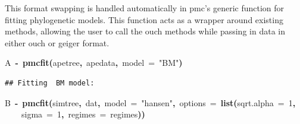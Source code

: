 \documentclass{elsarticle}
\makeatletter
\newcommand{\hlnumber}[1]{\textcolor[rgb]{0,0,0}{#1}}%
\newcommand{\hlfunctioncall}[1]{\textcolor[rgb]{.5,0,.33}{\textbf{#1}}}%
\newcommand{\hlstring}[1]{\textcolor[rgb]{.6,.6,1}{#1}}%
\newcommand{\hlkeyword}[1]{\textbf{#1}}%
\newcommand{\hlargument}[1]{\textcolor[rgb]{.69,.25,.02}{#1}}%
\newcommand{\hlassignement}[1]{\textbf{#1}}%
\newcommand{\hlsymbol}[1]{#1}%
\newcommand{\hlstd}[1]{\textcolor[rgb]{0,0,0}{#1}}%
\newenvironment{kframe}{%
 \def\FrameCommand##1{\hskip\@totalleftmargin \hskip-\fboxsep
 \colorbox{shadecolor}{##1}\hskip-\fboxsep
     \hskip-\linewidth \hskip-\@totalleftmargin \hskip\columnwidth}%
 \MakeFramed {\advance\hsize-\width
   \@totalleftmargin\z@ \linewidth\hsize
   \@setminipage}}%
 {\par\unskip\endMakeFramed}
\newenvironment{knitrout}{}{} %
\makeatother
\begin{document}
This format swapping is handled automatically in pmc's generic function for fitting phylogenetic models.  This function acts as a wrapper around existing methods, allowing the user to call the ouch methods while passing in data in either ouch or geiger format.   
\begin{knitrout}
\color{fgcolor}\begin{kframe}
\begin{flushleft}
\ttfamily\noindent
\hlsymbol{A}{\ }\hlassignement{\usebox{\hlnormalsizeboxlessthan}-}{\ }\hlfunctioncall{pmc\usebox{\hlnormalsizeboxunderscore}fit}\hlkeyword{(}\hlsymbol{ape}\hlkeyword{\usebox{\hlnormalsizeboxdollar}}\hlsymbol{tree}\hlkeyword{,}{\ }\hlsymbol{ape}\hlkeyword{\usebox{\hlnormalsizeboxdollar}}\hlsymbol{data}\hlkeyword{,}{\ }\hlargument{model}{\ }\hlargument{=}{\ }\hlstring{"{}BM"{}}\hlkeyword{)}\mbox{}
\normalfont
\end{flushleft}
\begin{verbatim}
## Fitting  BM model:
\end{verbatim}
\begin{flushleft}
\ttfamily\noindent
\hlsymbol{B}{\ }\hlassignement{\usebox{\hlnormalsizeboxlessthan}-}{\ }\hlfunctioncall{pmc\usebox{\hlnormalsizeboxunderscore}fit}\hlkeyword{(}\hlsymbol{simtree}\hlkeyword{,}{\ }\hlsymbol{dat}\hlkeyword{,}{\ }\hlargument{model}{\ }\hlargument{=}{\ }\hlstring{"{}hansen"{}}\hlkeyword{,}{\ }\hlargument{options}{\ }\hlargument{=}{\ }\hlfunctioncall{list}\hlkeyword{(}\hlargument{sqrt.alpha}{\ }\hlargument{=}{\ }\hlnumber{1}\hlkeyword{,}\hspace*{\fill}\\
\hlstd{}{\ }{\ }{\ }{\ }\hlargument{sigma}{\ }\hlargument{=}{\ }\hlnumber{1}\hlkeyword{,}{\ }\hlargument{regimes}{\ }\hlargument{=}{\ }\hlsymbol{regimes}\hlkeyword{)}\hlkeyword{)}\mbox{}
\normalfont
\end{flushleft}
\end{kframe}
\end{knitrout}
\end{document}
